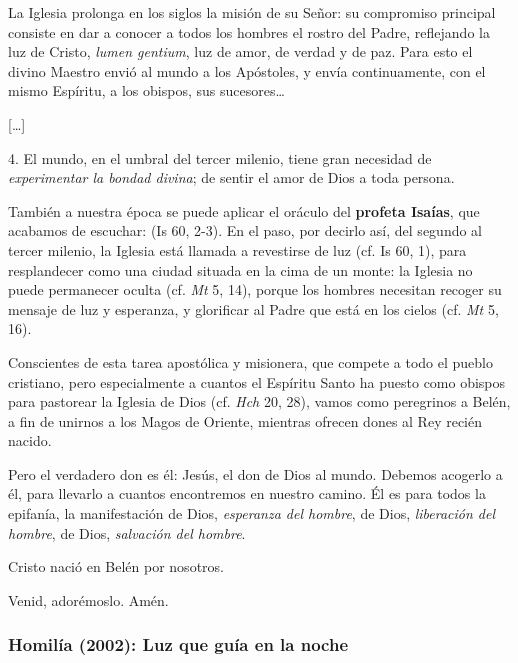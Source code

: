 \begin{body}
					La Iglesia prolonga en los siglos la misión de su Señor: su compromiso principal consiste en dar a conocer a todos los hombres el rostro del Padre, reflejando la luz de Cristo, \emph{lumen gentium}, luz de amor, de verdad y de paz. Para esto el divino Maestro envió al mundo a los Apóstoles, y envía continuamente, con el mismo Espíritu, a los obispos, sus sucesores\ldots{}
					
					{[}\ldots{}{]}
					
					4. El mundo, en el umbral del tercer milenio, tiene gran necesidad de \emph{experimentar la bondad divina}; de sentir el amor de Dios a toda persona.
					
					También a nuestra época se puede aplicar el oráculo del \textbf{profeta Isaías}, que acabamos de escuchar:  (Is 60, 2-3). En el paso, por decirlo así, del segundo al tercer milenio, la Iglesia está llamada a revestirse de luz (cf. Is 60, 1), para resplandecer como una ciudad situada en la cima de un monte: la Iglesia no puede permanecer oculta (cf. \emph{Mt} 5, 14), porque los hombres necesitan recoger su mensaje de luz y esperanza, y glorificar al Padre que está en los cielos (cf. \emph{Mt} 5, 16).
					
					Conscientes de esta tarea apostólica y misionera, que compete a todo el pueblo cristiano, pero especialmente a cuantos el Espíritu Santo ha puesto como obispos para pastorear la Iglesia de Dios (cf. \emph{Hch} 20, 28), vamos como peregrinos a Belén, a fin de unirnos a los Magos de Oriente, mientras ofrecen dones al Rey recién nacido.
					
					Pero el verdadero don es él: Jesús, el don de Dios al mundo. Debemos acogerlo a él, para llevarlo a cuantos encontremos en nuestro camino. Él es para todos la epifanía, la manifestación de Dios, \emph{esperanza del hombre}, de Dios, \emph{liberación del hombre}, de Dios, \emph{salvación del hombre}.
					
					Cristo nació en Belén por nosotros.
					
					Venid, adorémoslo. Amén.
				\end{body}
			
			\subsubsection{Homilía (2002): Luz que guía en la noche}
			
				
